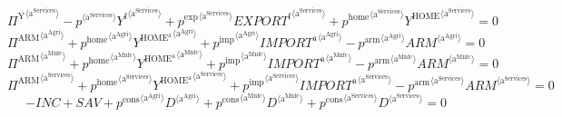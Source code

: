 \begin{equation}
{\Pi^{\mathrm{Y}}}^{\langle \mathrm{a}^{\mathrm{Services}}\rangle} - {{p}^{\langle \mathrm{a}^{\mathrm{Services}}\rangle}} {{Y^{\mathrm{f}}}^{\langle \mathrm{a}^{\mathrm{Services}}\rangle}} + {{p^{\mathrm{exp}}}^{\langle \mathrm{a}^{\mathrm{Services}}\rangle}} {{{E\!X\!P\!O\!R\!T}^{\mathrm{f}}}^{\langle \mathrm{a}^{\mathrm{Services}}\rangle}} + {{p^{\mathrm{home}}}^{\langle \mathrm{a}^{\mathrm{Services}}\rangle}} {{Y^{\mathrm{HOME}}}^{\langle \mathrm{a}^{\mathrm{Services}}\rangle}} = 0
\end{equation}
\begin{equation}
{\Pi^{\mathrm{ARM}}}^{\langle \mathrm{a}^{\mathrm{Agri}}\rangle} + {{p^{\mathrm{home}}}^{\langle \mathrm{a}^{\mathrm{Agri}}\rangle}} {{Y^{\mathrm{HOME}^{\mathrm{a}}}}^{\langle \mathrm{a}^{\mathrm{Agri}}\rangle}} + {{p^{\mathrm{imp}}}^{\langle \mathrm{a}^{\mathrm{Agri}}\rangle}} {{{I\!M\!P\!O\!R\!T}^{\mathrm{a}}}^{\langle \mathrm{a}^{\mathrm{Agri}}\rangle}} - {{p^{\mathrm{arm}}}^{\langle \mathrm{a}^{\mathrm{Agri}}\rangle}} {{{A\!R\!M}}^{\langle \mathrm{a}^{\mathrm{Agri}}\rangle}} = 0
\end{equation}
\begin{equation}
{\Pi^{\mathrm{ARM}}}^{\langle \mathrm{a}^{\mathrm{Mnfc}}\rangle} + {{p^{\mathrm{home}}}^{\langle \mathrm{a}^{\mathrm{Mnfc}}\rangle}} {{Y^{\mathrm{HOME}^{\mathrm{a}}}}^{\langle \mathrm{a}^{\mathrm{Mnfc}}\rangle}} + {{p^{\mathrm{imp}}}^{\langle \mathrm{a}^{\mathrm{Mnfc}}\rangle}} {{{I\!M\!P\!O\!R\!T}^{\mathrm{a}}}^{\langle \mathrm{a}^{\mathrm{Mnfc}}\rangle}} - {{p^{\mathrm{arm}}}^{\langle \mathrm{a}^{\mathrm{Mnfc}}\rangle}} {{{A\!R\!M}}^{\langle \mathrm{a}^{\mathrm{Mnfc}}\rangle}} = 0
\end{equation}
\begin{equation}
{\Pi^{\mathrm{ARM}}}^{\langle \mathrm{a}^{\mathrm{Services}}\rangle} + {{p^{\mathrm{home}}}^{\langle \mathrm{a}^{\mathrm{Services}}\rangle}} {{Y^{\mathrm{HOME}^{\mathrm{a}}}}^{\langle \mathrm{a}^{\mathrm{Services}}\rangle}} + {{p^{\mathrm{imp}}}^{\langle \mathrm{a}^{\mathrm{Services}}\rangle}} {{{I\!M\!P\!O\!R\!T}^{\mathrm{a}}}^{\langle \mathrm{a}^{\mathrm{Services}}\rangle}} - {{p^{\mathrm{arm}}}^{\langle \mathrm{a}^{\mathrm{Services}}\rangle}} {{{A\!R\!M}}^{\langle \mathrm{a}^{\mathrm{Services}}\rangle}} = 0
\end{equation}
\begin{equation}
-{I\!N\!C} + {S\!A\!V} + {{p^{\mathrm{cons}}}^{\langle \mathrm{a}^{\mathrm{Agri}}\rangle}} {{D}^{\langle \mathrm{a}^{\mathrm{Agri}}\rangle}} + {{p^{\mathrm{cons}}}^{\langle \mathrm{a}^{\mathrm{Mnfc}}\rangle}} {{D}^{\langle \mathrm{a}^{\mathrm{Mnfc}}\rangle}} + {{p^{\mathrm{cons}}}^{\langle \mathrm{a}^{\mathrm{Services}}\rangle}} {{D}^{\langle \mathrm{a}^{\mathrm{Services}}\rangle}} = 0
\end{equation}
